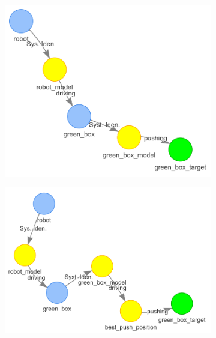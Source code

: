 \begin{figure}[H]
    \begin{subfigure}{.3\textwidth}
    \centering
    \includegraphics[width=1.1\textwidth]{figures/connecting_nodes/robot_push_4}
    \caption{}\label{subfig:robot_push_4}
    \end{subfigure}
    \begin{subfigure}{.3\textwidth}
    \centering
    \includegraphics[width=1.1\textwidth]{figures/connecting_nodes/robot_push_5}
    \caption{}\label{subfig:robot_push_5}
    \end{subfigure}
    \begin{subfigure}{.3\textwidth}
    \centering

\end{subfigure}
\end{figure}
